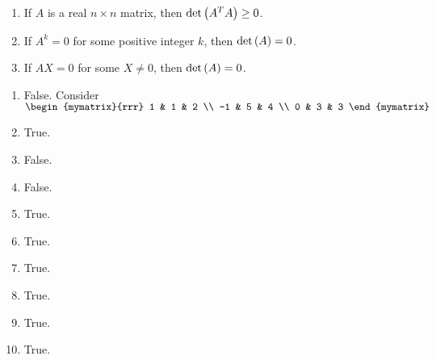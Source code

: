 \begin{enumialphparenastyle}
\begin{ex}
\begin{enumerate}
\item If $A$ is a real $n\times n$ matrix, then $\det \left(A^{T}A\right)
\geq 0$.

\item If $A^{k}=0$ for some positive integer $k$, then $\det \left(
A\right) =0$.

\item If $AX=0$ for some $X \neq 0$, then $\det \left(
A\right) =0$.
\end{enumerate}
\begin{sol}
\begin{enumerate}
\item False. Consider $\begin{mymatrix}{rrr}
1 & 1 & 2 \\
-1 & 5 & 4 \\
0 & 3 & 3
\end{mymatrix} $
\item True.
\item False.
\item False.
\item True.
\item True.
\item True.
\item True.
\item True.
\item True.
\end{enumerate}
\end{sol}
\end{ex}

\end{enumialphparenastyle}